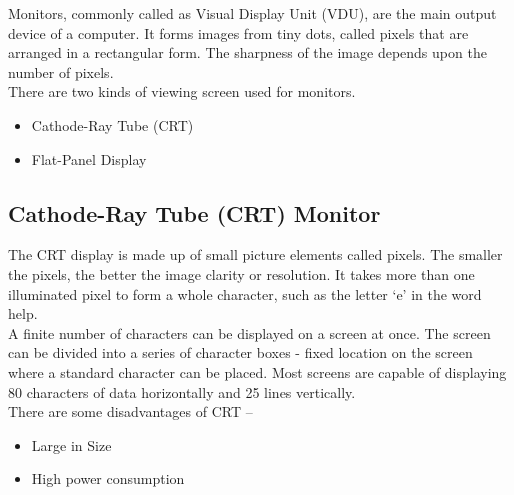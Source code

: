 \documentclass[11pt,a4paper,twoside]{article}
\begin{document}
Monitors, commonly called as Visual Display Unit (VDU), are the main output device of a computer. It forms images from tiny dots, called pixels that are arranged in a rectangular form. The sharpness of the image depends upon the number of pixels. \\
There are two kinds of viewing screen used for monitors.
\begin{itemize}
    \item Cathode-Ray Tube (CRT)
\item Flat-Panel Display
\end{itemize}
 \subsection{Cathode-Ray Tube (CRT) Monitor}
 The CRT display is made up of small picture elements called pixels. The smaller the pixels, the better the image clarity or resolution. It takes more than one illuminated pixel to form a whole character, such as the letter ‘e’ in the word help.\\
 A finite number of characters can be displayed on a screen at once. The screen can be divided into a series of character boxes - fixed location on the screen where a standard character can be placed. Most screens are capable of displaying 80 characters of data horizontally and 25 lines vertically. \\
There are some disadvantages of CRT – 
\begin{itemize}
    \item Large in Size  
\item High power consumption
\end{itemize}
\end{document}
